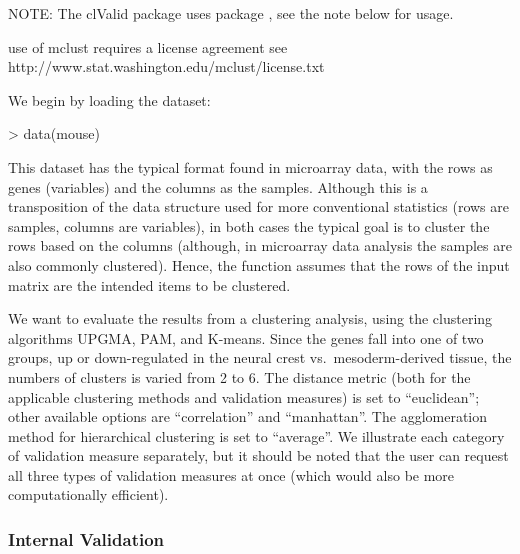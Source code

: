 \documentclass[11pt]{article}
\begin{document}

NOTE: The clValid package uses package , see the note
below for usage.


\begin{Schunk}
\begin{Soutput}
use of mclust requires a license agreement
see http://www.stat.washington.edu/mclust/license.txt
\end{Soutput}
\end{Schunk}

We begin by loading the dataset:
\begin{Schunk}
\begin{Sinput}
> data(mouse)
\end{Sinput}
\end{Schunk}
This dataset has the typical format found in  microarray
data, with the rows as genes (variables) and the columns as the
samples. 
Although this is a transposition of the data structure used for more
conventional statistics (rows are samples, columns are variables),
in both cases the typical goal is to cluster the rows based on the
columns (although, in microarray data analysis the samples are also
commonly clustered).  Hence, the  function assumes that
the rows of the input matrix are the intended items to be clustered.

We want to evaluate the results from a clustering analysis, using the
clustering algorithms UPGMA, PAM, and K-means.   Since the genes fall
into one of two groups, up or down-regulated in the neural
crest vs.~mesoderm-derived tissue, the numbers of clusters is varied
from 2 to 6.  The distance metric (both for the applicable
clustering methods and validation measures) is set to ``euclidean''; other available options are
``correlation'' and ``manhattan''.  The agglomeration method for
hierarchical clustering is set to ``average''.  
We illustrate each category of validation measure separately, but it
should be noted that the user can request all three types of
validation measures at once (which would also be more computationally efficient).


\subsubsection*{Internal Validation}
\end{document}
